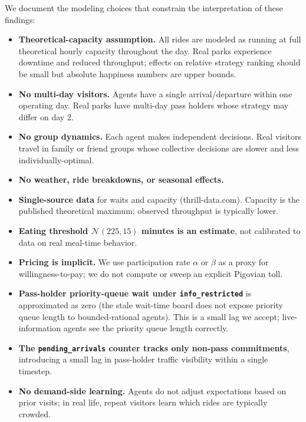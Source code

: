 \documentclass[11pt]{article}
\begin{document}
We document the modeling choices that constrain the interpretation of these findings:

\begin{itemize}[nosep]
    \item \textbf{Theoretical-capacity assumption.} All rides are modeled as running at full theoretical hourly capacity throughout the day. Real parks experience downtime and reduced throughput; effects on relative strategy ranking should be small but absolute happiness numbers are upper bounds.
    \item \textbf{No multi-day visitors.} Agents have a single arrival/departure within one operating day. Real parks have multi-day pass holders whose strategy may differ on day 2.
    \item \textbf{No group dynamics.} Each agent makes independent decisions. Real visitors travel in family or friend groups whose collective decisions are slower and less individually-optimal.
    \item \textbf{No weather, ride breakdowns, or seasonal effects.}
    \item \textbf{Single-source data} for waits and capacity (thrill-data.com). Capacity is the published theoretical maximum; observed throughput is typically lower.
    \item \textbf{Eating threshold $\mathcal{N}(225, 15)$ minutes is an estimate}, not calibrated to data on real meal-time behavior.
    \item \textbf{Pricing is implicit.} We use participation rate $\alpha$ or $\beta$ as a proxy for willingness-to-pay; we do not compute or sweep an explicit Pigovian toll.
    \item \textbf{Pass-holder priority-queue wait under \texttt{info\_restricted}} is approximated as zero (the stale wait-time board does not expose priority queue length to bounded-rational agents). This is a small lag we accept; live-information agents see the priority queue length correctly.
    \item \textbf{The \texttt{pending\_arrivals} counter tracks only non-pass commitments}, introducing a small lag in pass-holder traffic visibility within a single timestep.
    \item \textbf{No demand-side learning.} Agents do not adjust expectations based on prior visits; in real life, repeat visitors learn which rides are typically crowded.
\end{itemize}

\end{document}
